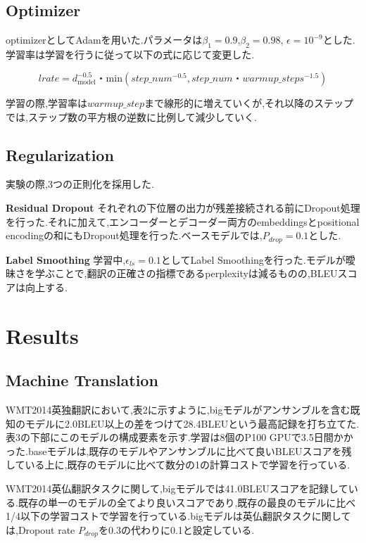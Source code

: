 \documentclass{jarticle}     %
\begin{document}
\subsection{Optimizer}
optimizerとしてAdamを用いた.パラメータは$\beta_\mathrm{1} = 0.9$,$\beta_\mathrm{2} = 0.98$, $\epsilon = 10^{-9}$とした.学習率は学習を行うに従って以下の式に応じて変更した.

\begin{equation}
  lrate = d_\mathrm{model}^{-0.5}・\mathrm{min}(step\_num^{-0.5},step\_num・warmup\_steps^{-1.5})
\end{equation}

学習の際,学習率は$warmup\_step$まで線形的に増えていくが,それ以降のステップでは,ステップ数の平方根の逆数に比例して減少していく.

\subsection{Regularization}
実験の際,3つの正則化を採用した.

\textbf{Residual Dropout}
それぞれの下位層の出力が残差接続される前にDropout処理を行った.それに加えて,エンコーダーとデコーダー両方のembeddingsとpositional encodingの和にもDropout処理を行った.ベースモデルでは,$P_{drop} = 0.1$とした.

\textbf{Label Smoothing}
学習中,$\epsilon_{ls} = 0.1$としてLabel Smoothingを行った.モデルが曖昧さを学ぶことで,翻訳の正確さの指標であるperplexityは減るものの,BLEUスコアは向上する.

\section{Results}


\subsection{Machine Translation}
WMT2014英独翻訳において,表2に示すように,bigモデルがアンサンブルを含む既知のモデルに2.0BLEU以上の差をつけて28.4BLEUという最高記録を打ち立てた.表3の下部にこのモデルの構成要素を示す.学習は8個のP100 GPUで3.5日間かかった.baseモデルは,既存のモデルやアンサンブルに比べて良いBLEUスコアを残している上に,既存のモデルに比べて数分の1の計算コストで学習を行っている.
\par
WMT2014英仏翻訳タスクに関して,bigモデルでは41.0BLEUスコアを記録している.既存の単一のモデルの全てより良いスコアであり,既存の最良のモデルに比べ1/4以下の学習コストで学習を行っている.bigモデルは英仏翻訳タスクに関しては,Dropout rate $P_{drop}$を0.3の代わりに0.1と設定している.
\par
\end{document}
